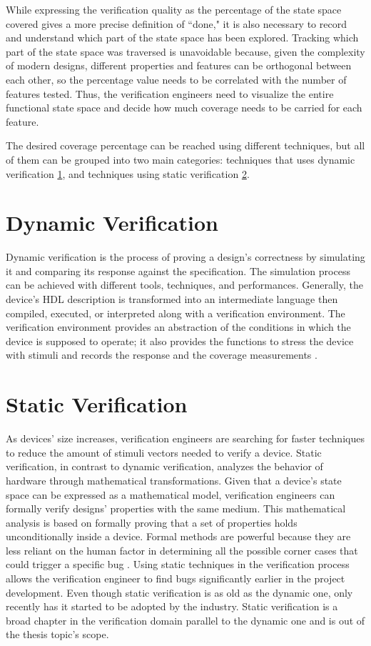 While expressing the verification quality as the percentage of the state space
covered gives a more precise definition of ``done," it is also necessary to
record and understand which part of the state space has been explored. Tracking
which part of the state space was traversed is unavoidable because, given the
complexity of modern designs, different properties and features can be
orthogonal between each other, so the percentage value needs to be correlated
with the number of features tested. Thus, the verification engineers need to
visualize the entire functional state space and decide how much coverage needs
to be carried for each feature.

The desired coverage percentage can be reached using different techniques, but
all of them can be grouped into two main categories: techniques that uses
dynamic verification \ref{sec:ver:dynamic}, and techniques using static
verification \ref{sec:ver:static}.


\section{Dynamic Verification}\label{sec:ver:dynamic}
Dynamic verification is the process of proving a design's correctness by
simulating it and comparing its response against the specification. The
simulation process can be achieved with different tools, techniques, and
performances. Generally, the device's HDL description is transformed into an
intermediate language then compiled, executed, or interpreted along with a
verification environment. The verification environment provides an abstraction
of the conditions in which the device is supposed to operate; it also provides
the functions to stress the device with stimuli and records the response and the
coverage measurements \cite{piziali2007functional}.

\section{Static Verification}\label{sec:ver:static}
As devices' size increases, verification engineers are searching for faster
techniques to reduce the amount of stimuli vectors needed to verify a device.
Static verification, in contrast to dynamic verification, analyzes the behavior
of hardware through mathematical transformations. Given that a device's state
space can be expressed as a mathematical model, verification engineers can
formally verify designs' properties with the same medium. This mathematical
analysis is based on formally proving that a set of properties holds
unconditionally inside a device. Formal methods are powerful because they are
less reliant on the human factor in determining all the possible corner cases
that could trigger a specific bug \cite{piziali2007functional}. Using static
techniques in the verification process allows the verification engineer to find
bugs significantly earlier in the project development. Even though static
verification is as old as the dynamic one, only recently has it started to be
adopted by the industry. Static verification is a broad chapter in the
verification domain parallel to the dynamic one and is out of the thesis topic's
scope.

